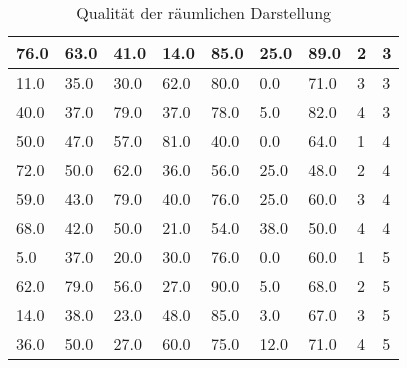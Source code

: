 \begin{table}[!ht]
{\begin{tabular}{|l|l|l|l|l|l|l|l|l|}
76.0                          & 63.0               & 41.0                   & 14.0                        & 85.0           & 25.0             & 89.0                   & 2              & 3                    \\ \hline
11.0                          & 35.0               & 30.0                   & 62.0                        & 80.0           & 0.0              & 71.0                   & 3              & 3                    \\ \hline
40.0                          & 37.0               & 79.0                   & 37.0                        & 78.0           & 5.0              & 82.0                   & 4              & 3                    \\ \hline
50.0                          & 47.0               & 57.0                   & 81.0                        & 40.0           & 0.0              & 64.0                   & 1              & 4                    \\ \hline
72.0                          & 50.0               & 62.0                   & 36.0                        & 56.0           & 25.0             & 48.0                   & 2              & 4                    \\ \hline
59.0                          & 43.0               & 79.0                   & 40.0                        & 76.0           & 25.0             & 60.0                   & 3              & 4                    \\ \hline
68.0                          & 42.0               & 50.0                   & 21.0                        & 54.0           & 38.0             & 50.0                   & 4              & 4                    \\ \hline
5.0                           & 37.0               & 20.0                   & 30.0                        & 76.0           & 0.0              & 60.0                   & 1              & 5                    \\ \hline
62.0                          & 79.0               & 56.0                   & 27.0                        & 90.0           & 5.0              & 68.0                   & 2              & 5                    \\ \hline
14.0                          & 38.0               & 23.0                   & 48.0                        & 85.0           & 3.0              & 67.0                   & 3              & 5                    \\ \hline
36.0                          & 50.0               & 27.0                   & 60.0                        & 75.0           & 12.0             & 71.0                   & 4              & 5                    \\ \hline
\end{tabular}%
}
\caption {Qualität der räumlichen Darstellung}
\end{table}